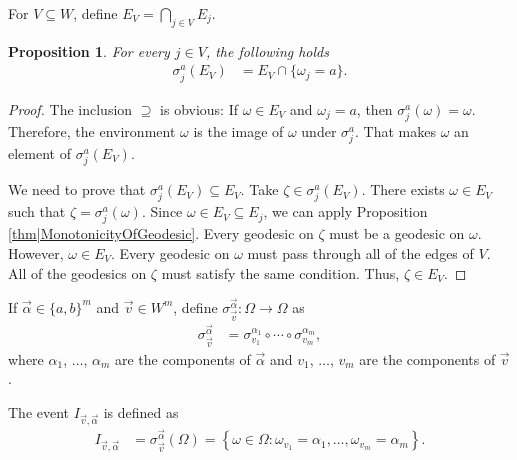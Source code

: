 \documentclass[reqno]{amsart}
\newtheorem{proposition}{Proposition}
\begin{document}
For $V\subseteq W$, define $E_V=\bigcap_{j\in V}E_j$.

\begin{proposition} For every $j\in V$, the following holds 
\begin{align*} 
\sigma_j^a\left(E_V\right)&=E_V\cap \{\omega_j=a\}.  
\end{align*}
\end{proposition}

\begin{proof} The inclusion $\supseteq$ is obvious: If $\omega\in E_V$ and $\omega_j=a$, then $\sigma_j^a(\omega)=\omega$. Therefore, the environment $\omega$ is the image of $\omega$ under $\sigma_j^a$. That makes $\omega$ an element of $\sigma_j^a(E_V)$.


We need to prove that $\sigma_j^a(E_V)\subseteq E_V$. Take $\zeta\in \sigma_j^a(E_V)$. There exists $\omega\in E_V$ such that $\zeta=\sigma_j^a(\omega)$. Since $\omega\in E_V\subseteq E_j$, we can apply Proposition 
\ref{thm|MonotonicityOfGeodesic}. Every geodesic on $\zeta$ must be a geodesic on $\omega$. However, $\omega\in E_V$. Every geodesic on $\omega$ must pass through all of the edges of $V$. All of the geodesics on $\zeta$ must satisfy the same condition. Thus, $\zeta\in E_V$.
\end{proof}  




If $\overrightarrow \alpha\in \{a,b\}^m$ and $\overrightarrow v\in W^m$, define $\sigma_{\overrightarrow v}^{\overrightarrow\alpha}:\Omega\to \Omega$ as 
\begin{align*}
\sigma_{\overrightarrow v}^{\overrightarrow\alpha}&=\sigma_{v_1}^{\alpha_1}\circ\cdots\circ\sigma_{v_m}^{\alpha_m},
\end{align*}
where $\alpha_1$, $\dots$, $\alpha_m$ are the components of $\overrightarrow\alpha$ and $v_1$, $\dots$, $v_m$ are the components of $\overrightarrow v$.

The event $I_{\overrightarrow v, \overrightarrow \alpha}$ is defined as 
\begin{align*}
I_{\overrightarrow v,\overrightarrow\alpha}&=\sigma_{\overrightarrow v}^{\overrightarrow \alpha}(\Omega)=\left\{\omega\in\Omega: \omega_{v_1}=\alpha_1, \dots, \omega_{v_m}=\alpha_m\right\}. 
\end{align*}
\end{document}
